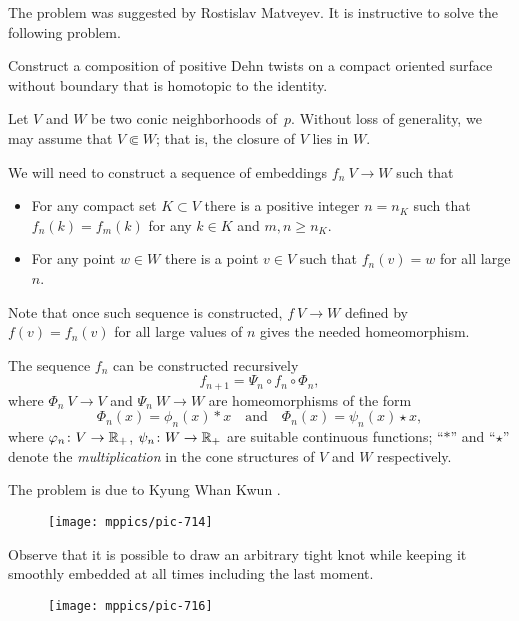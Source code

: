 The problem was suggested by Rostislav Matveyev.
It is instructive to solve the following problem.

\begin{pr}
Construct a composition of positive Dehn twists on a compact oriented surface without boundary that is homotopic to the identity. 
\end{pr}




Let $V$ and $W$ be two conic neighborhoods of~$p$.
Without loss of generality, we may assume that $V\Subset W$;
that is, the closure of $V$ lies in $W$.

We will need to construct a sequence of embeddings $f_n\:V\to W$
such that 
\begin{itemize}
\item 
For any compact set $K\subset V$ 
there is a positive integer $n=n_K$ such that 
$f_n(k)=f_m(k)$ for any $k\in K$ and $m, n \ge n_K$.
\item For any point $w\in W$ there is a point $v\in V$ such that $f_n(v)=w$ for all large $n$.
\end{itemize}

Note that once such sequence is constructed, $f\:V\to W$ defined by $f(v)=f_n(v)$ for all large values of $n$ gives the needed homeomorphism.

The sequence $f_n$ can be constructed recursively
\[f_{n+1}=\Psi_n\circ f_n\circ \Phi_n,\]
where $\Phi_n\:V\to V$ 
and $\Psi_n\:W\to W$ 
are homeomorphisms
of the form 
\[\Phi_n(x)=\phi_n(x)\ast x\quad \text{and}\quad \Phi_n(x)=\psi_n(x)\star x,\]
where $\varphi_n\colon V\to \mathbb{R}_+$, $\psi_n\colon W\to \mathbb{R}_+$ are suitable continuous functions;
``$\ast$'' and ``$\star$'' denote the {}\emph{multiplication} in the cone structures of $V$ and $W$ respectively.\qeds


The problem is due to Kyung Whan Kwun \cite{kwun}.


\begin{figure}[h!]
\vskip0mm
\centering
\texttt{[image: mppics/pic-714]}
\end{figure}

Observe that it is possible to draw an arbitrary tight knot 
while keeping it smoothly embedded at all times including the last moment.\qeds


\begin{wrapfigure}[6]{r}{50 mm}
\vskip-3mm
\centering
\texttt{[image: mppics/pic-716]}
\end{wrapfigure}

